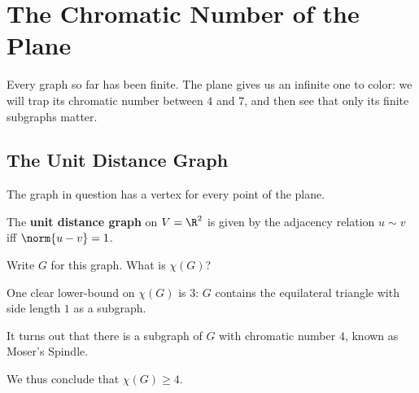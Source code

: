 \section{The Chromatic Number of the Plane}

Every graph so far has been finite. The plane gives us an infinite one to color: we will trap its chromatic number between $4$ and $7$, and then see that only its finite subgraphs matter.

\subsection{The Unit Distance Graph}

The graph in question has a vertex for every point of the plane.

\begin{boxdefinition}
    The \textbf{unit distance graph} on $V = \R^2$ is given by the adjacency relation $u \sim v$ iff $\norm{u - v} = 1$.
\end{boxdefinition}

Write $G$ for this graph. What is $\chi(G)$?

One clear lower-bound on $\chi(G)$ is $3$: $G$ contains the equilateral triangle with side length $1$ as a subgraph.

It turns out that there is a subgraph of $G$ with chromatic number $4$, known as Moser's Spindle.
\begin{figure}[H]
    \centering
\end{figure}
We thus conclude that $\chi(G) \geq 4$.

